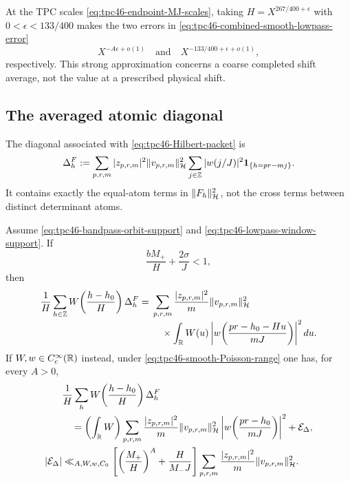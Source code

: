 At the TPC scales \eqref{eq:tpc46-endpoint-MJ-scales}, taking
\(H=X^{267/400+\epsilon}\) with
\(0<\epsilon<133/400\) makes the two errors in
\eqref{eq:tpc46-combined-smooth-lowpass-error}
\begin{equation}
 X^{-A\epsilon+o(1)}
 \quad\text{and}\quad
 X^{-133/400+\epsilon+o(1)},
 \label{eq:tpc46-endpoint-smooth-average-errors}
\end{equation}
respectively.  This strong approximation concerns a coarse completed
shift average, not the value at a prescribed physical shift.

\subsection{The averaged atomic diagonal}

The diagonal associated with
\eqref{eq:tpc46-Hilbert-packet} is
\begin{equation}
 \Delta_h^F:=
 \sum_{p,r,m}|z_{p,r,m}|^2\|v_{p,r,m}\|_{\mathcal H}^2
 \sum_{j\in\mathbb Z}|w(j/J)|^2\mathbf 1_{\{h=pr-mj\}}.
 \label{eq:tpc46-atomic-diagonal-by-shift}
\end{equation}
It contains exactly the equal-atom terms in \(\|F_h\|_{\mathcal H}^2\), not
the cross terms between distinct determinant atoms.

\begin{theorem}
\label{thm:tpc46-exact-averaged-atomic-diagonal}
Assume \eqref{eq:tpc46-bandpass-orbit-support} and
\eqref{eq:tpc46-lowpass-window-support}.  If
\begin{equation}
 \frac{bM_+}{H}+\frac{2\sigma}{J}<1,
 \label{eq:tpc46-diagonal-no-alias-condition}
\end{equation}
then
\begin{align}
 \frac1H\sum_{h\in\mathbb Z}
 W\!\left(\frac{h-h_0}{H}\right)\Delta_h^F
 ={}&\sum_{p,r,m}
 \frac{|z_{p,r,m}|^2}{m}\|v_{p,r,m}\|_{\mathcal H}^2
 \notag\\[-2pt]
 &\quad\times
 \int_{\mathbb R}W(u)
 \left|w\!\left(
 \frac{pr-h_0-Hu}{mJ}
 \right)\right|^2du.
 \label{eq:tpc46-exact-averaged-diagonal-formula}
\end{align}
If \(W,w\in C_c^\infty(\mathbb R)\) instead, under
\eqref{eq:tpc46-smooth-Poisson-range} one has, for every \(A>0\),
\begin{align}
 &\frac1H\sum_h
 W\!\left(\frac{h-h_0}{H}\right)\Delta_h^F
 \notag\\
 &\quad=\left(\int_{\mathbb R}W\right)
 \sum_{p,r,m}
 \frac{|z_{p,r,m}|^2}{m}\|v_{p,r,m}\|_{\mathcal H}^2
 \left|w\!\left(\frac{pr-h_0}{mJ}\right)\right|^2
 +\mathcal E_{\Delta},
 \label{eq:tpc46-smooth-averaged-diagonal-main}\\
 |\mathcal E_{\Delta}|
 &\ll_{A,W,w,C_0}
 \left[
 \left(\frac{M_+}{H}\right)^A
 +\frac{H}{M_-J}
 \right]
 \sum_{p,r,m}
 \frac{|z_{p,r,m}|^2}{m}\|v_{p,r,m}\|_{\mathcal H}^2.
 \label{eq:tpc46-smooth-averaged-diagonal-error}
\end{align}
\end{theorem}

